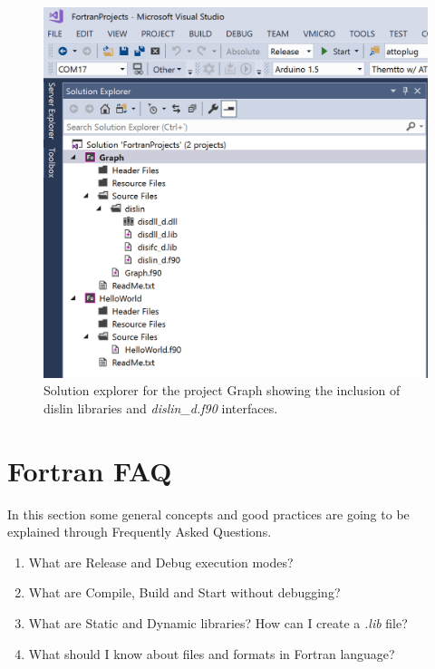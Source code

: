 \begin{figure}
    \centering
    \includegraphics[width= \linewidth ]{Figures/dislin}
    \caption{Solution explorer for the project Graph showing the inclusion of dislin libraries and \textit{dislin\_d.f90} interfaces.}
    \label{fig:dislin}
\end{figure}



    \section{Fortran FAQ}

In this section some general concepts and good practices are going to be explained through Frequently Asked Questions.

\begin{enumerate}[nosep]
    \item What are Release and Debug execution modes?
    \item What are Compile, Build and Start without debugging?
    \item What are Static and Dynamic libraries? How can I create a \textit{.lib} file?
    \item What should I know about files and formats in Fortran language?
\end{enumerate}

